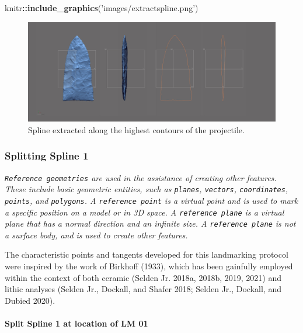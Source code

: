 \documentclass[
]{article}
\newenvironment{Shaded}{\begin{snugshade}}{\end{snugshade}}
\newcommand{\KeywordTok}[1]{\textcolor[rgb]{0.13,0.29,0.53}{\textbf{#1}}}
\newcommand{\NormalTok}[1]{#1}
\newcommand{\OperatorTok}[1]{\textcolor[rgb]{0.81,0.36,0.00}{\textbf{#1}}}
\newcommand{\StringTok}[1]{\textcolor[rgb]{0.31,0.60,0.02}{#1}}
\begin{document}
\begin{Shaded}
\begin{Highlighting}[]
\NormalTok{knitr}\OperatorTok{::}\KeywordTok{include_graphics}\NormalTok{(}\StringTok{'images/extractspline.png'}\NormalTok{)}
\end{Highlighting}
\end{Shaded}

\begin{figure}
\includegraphics[width=1\linewidth]{images/extractspline} \caption{Spline extracted along the highest contours of the projectile.}\label{fig:figspline}
\end{figure}

\hypertarget{splitting-spline-1}{%
\subsubsection{Splitting Spline 1}\label{splitting-spline-1}}

\emph{\texttt{Reference\ geometries} are used in the assistance of
creating other features. These include basic geometric entities, such as
\texttt{planes}, \texttt{vectors}, \texttt{coordinates},
\texttt{points}, and \texttt{polygons}. A \texttt{reference\ point} is a
virtual point and is used to mark a specific position on a model or in
3D space. A \texttt{reference\ plane} is a virtual plane that has a
normal direction and an infinite size. A \texttt{reference\ plane} is
not a surface body, and is used to create other features.}

The characteristic points and tangents developed for this landmarking
protocol were inspired by the work of Birkhoff (1933), which has been
gainfully employed within the context of both ceramic (Selden Jr. 2018a,
2018b, 2019, 2021) and lithic analyses (Selden Jr., Dockall, and Shafer
2018; Selden Jr., Dockall, and Dubied 2020).

\hypertarget{split-spline-1-at-location-of-lm-01}{%
\paragraph{Split Spline 1 at location of LM
01}\label{split-spline-1-at-location-of-lm-01}}
\end{document}
